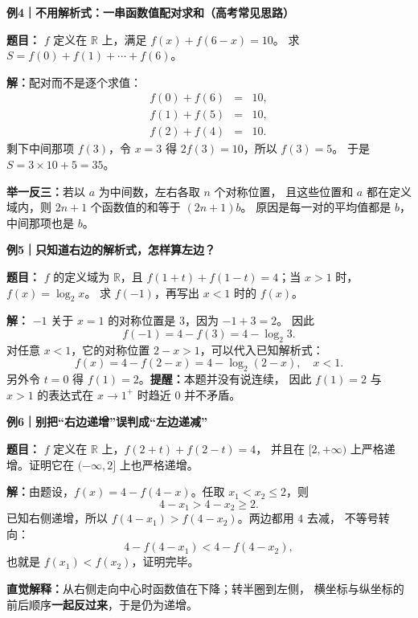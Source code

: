 \begin{examplebox}
\textbf{\textcolor{CExample}{例4｜不用解析式：一串函数值配对求和（高考常见思路）}}



\textbf{题目：} $f$ 定义在 $\mathbb R$ 上，满足 $f(x)+f(6-x)=10$。
求 $S=f(0)+f(1)+\cdots+f(6)$。

\textbf{解：}配对而不是逐个求值：
\[
\begin{array}{rcl}
 f(0)+f(6)&=&10,\\
 f(1)+f(5)&=&10,\\
 f(2)+f(4)&=&10.
\end{array}
\]
剩下中间那项 $f(3)$，令 $x=3$ 得 $2f(3)=10$，所以 $f(3)=5$。
于是 $S=3\times10+5=\boxed{35}$。

\textbf{举一反三：}若以 $a$ 为中间数，左右各取 $n$ 个对称位置，
且这些位置和 $a$ 都在定义域内，则 $2n+1$ 个函数值的和等于 $(2n+1)b$。
原因是每一对的平均值都是 $b$，中间那项也是 $b$。

\medskip

\end{examplebox}
\clearpage
\begin{examplebox}
\textbf{\textcolor{CExample}{例5｜只知道右边的解析式，怎样算左边？}}



\textbf{题目：} $f$ 的定义域为 $\mathbb R$，且
$f(1+t)+f(1-t)=4$；当 $x>1$ 时，$f(x)=\log_2 x$。
求 $f(-1)$，再写出 $x<1$ 时的 $f(x)$。

\textbf{解：} $-1$ 关于 $x=1$ 的对称位置是 $3$，因为 $-1+3=2$。
因此
\[
 f(-1)=4-f(3)=\boxed{4-\log_2 3}.
\]
对任意 $x<1$，它的对称位置 $2-x>1$，可以代入已知解析式：
\[
\boxed{\ f(x)=4-f(2-x)=4-\log_2(2-x),\quad x<1.\ }
\]
另外令 $t=0$ 得 $f(1)=2$。\textbf{提醒：}本题并没有说连续，
因此 $f(1)=2$ 与 $x>1$ 的表达式在 $x\to1^+$ 时趋近 $0$ 并不矛盾。

\medskip

\end{examplebox}
\clearpage
\begin{examplebox}
\textbf{\textcolor{CExample}{例6｜别把“右边递增”误判成“左边递减”}}



\textbf{题目：} $f$ 定义在 $\mathbb R$ 上，$f(2+t)+f(2-t)=4$，
并且在 $[2,+\infty)$ 上严格递增。证明它在 $(-\infty,2]$ 上也严格递增。

\textbf{解：}由题设，$f(x)=4-f(4-x)$。任取 $x_1<x_2\le2$，则
\[
4-x_1>4-x_2\ge2.
\]
已知右侧递增，所以 $f(4-x_1)>f(4-x_2)$。两边都用 $4$ 去减，
不等号转向：
\[
4-f(4-x_1)<4-f(4-x_2),
\]
也就是 $f(x_1)<f(x_2)$，证明完毕。

\textbf{直觉解释：}从右侧走向中心时函数值在下降；转半圈到左侧，
横坐标与纵坐标的前后顺序\textbf{一起反过来}，于是仍为递增。

\medskip

\end{examplebox}
